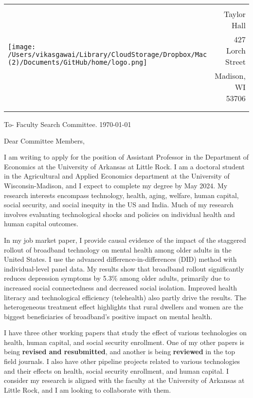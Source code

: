 \documentclass[12pt]{letter}
\begin{document}
\begin{tabularx}{\textwidth}{Xr}
\multirow{4}{*}{\texttt{[image: /Users/vikasgawai/Library/CloudStorage/Dropbox/Mac (2)/Documents/GitHub/home/logo.png]}} &  \\
& Taylor Hall \\
& 427 Lorch Street \\
& Madison, WI 53706 \\
[-1.8ex]\\
\\
\end{tabularx}

To- Faculty Search Committee. \hfill \today 
\medskip

Dear Committee Members,

I am writing to apply for the position of Assistant Professor in the Department of Economics at the University of Arkansas at Little Rock. I am a doctoral student in the Agricultural and Applied Economics department at the University of Wisconsin-Madison, and I expect to complete my degree by May 2024. My research interests encompass technology, health, aging, welfare, human capital, social security, and social inequity in the US and India. Much of my research involves evaluating technological shocks and policies on individual health and human capital outcomes.

In my job market paper, I provide causal evidence of the impact of the staggered rollout of broadband technology on mental health among older adults in the United States. I use the advanced difference-in-differences (DID) method with individual-level panel data. My results show that broadband rollout significantly reduces depression symptoms by 5.3\% among older adults, primarily due to increased social connectedness and decreased social isolation. Improved health literacy and technological efficiency (telehealth) also partly drive the results. The heterogeneous treatment effect highlights that rural dwellers and women are the biggest beneficiaries of broadband’s positive impact on mental health. 


I have three other working papers that study the effect of various technologies on health, human capital, and social security enrollment. One of my other papers is being \textbf{revised and resubmitted}, and another is being  \textbf{reviewed} in the top field journals. I also have other pipeline projects related to various technologies and their effects on health, social security enrollment, and human capital. I consider my research is aligned with the faculty at the University of Arkansas at Little Rock, and I am looking to collaborate with them.
\end{document}
